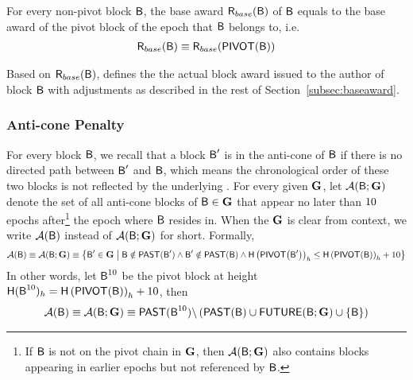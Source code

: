 	For every non-pivot block $\textsf{B}$,
	the base award $\textsf{R}_{base}(\textsf{B})$ of $\textsf{B}$ 
	equals to the base award of the pivot block of the epoch that $\textsf{B}$ belongs to,
	i.e. 
	\begin{align*}
		\textsf{R}_{base}(\textsf{B})\equiv \textsf{R}_{base}(\mathsf{PIVOT}{\left({\textsf{B}} \right)})
	\end{align*}

	Based on $\textsf{R}_{base}(\textsf{B})$, 
	\name defines the the actual block award issued to the author of block $\textsf{B}$ with  adjustments as described in the rest of Section~\ref{subsec:baseaward}.



\subsubsection{Anti-cone Penalty}
\label{subsec:anticone}

For every block $\textsf{B}$, we recall that a block $\textsf{B}'$ is in the anti-cone of $\textsf{B}$ if there is no directed path between $\textsf{B}'$ and $\textsf{B}$, which means the chronological order of these two blocks is not reflected by the underlying \tg.
For every given \tg $\textbf{G}$, let $\mathcal{A}(\textsf{B};\textbf{G})$ denote the set of all anti-cone blocks of $\textsf{B}\in\textbf{G}$ that appear no later than ${10}$ epochs after\footnote{If $\textsf{B}$ is not on the pivot chain in $\textbf{G}$, then $\mathcal{A}(\textsf{B};\textbf{G})$ also contains blocks appearing in earlier epochs but not referenced by $\textsf{B}$.} the epoch where $\textsf{B}$ resides in.
When the \tg $\textbf{G}$ is clear from context, we write $\mathcal{A}(\textsf{B})$ instead of $\mathcal{A}(\textsf{B};\textbf{G})$ for short. 
Formally,
\begin{align}
	\mathcal{A}(\textsf{B})\equiv \mathcal{A}(\textsf{B};\textbf{G}) \equiv  {\left \{{\textsf{B}' \in \textbf{G}\;\big|\; \textsf{B}\notin\ensuremath{\mathsf{PAST}}(\textsf{B}') \land \textsf{B}'\notin\ensuremath{\mathsf{PAST}}(\textsf{B})  \land \textsf{H}\left(\ensuremath{\mathsf{PIVOT}{\left({\textsf{B}'} \right)}}\right)_h\le \textsf{H}\left(\ensuremath{\mathsf{PIVOT}{\left({\textsf{B}} \right)}}\right)_h+10 } \right \}}   
\end{align}
In other words, let $\textsf{B}^{10}$ be the pivot block at height $\textsf{H}(\textsf{B}^{10})_h=\textsf{H}\left(\mathsf{PIVOT}{\left({\textsf{B}} \right)}\right)_h+10$,
then 
\begin{align}
	\mathcal{A}(\textsf{B})\equiv \mathcal{A}(\textsf{B};\textbf{G}) \equiv \mathsf{PAST}(\textsf{B}^{10})\backslash\left( \mathsf{PAST}(\textsf{B})\cup \mathsf{FUTURE}(\textsf{B};\textbf{G}) \cup {\left \{{\textsf{B}} \right \}} \right)
\end{align}

